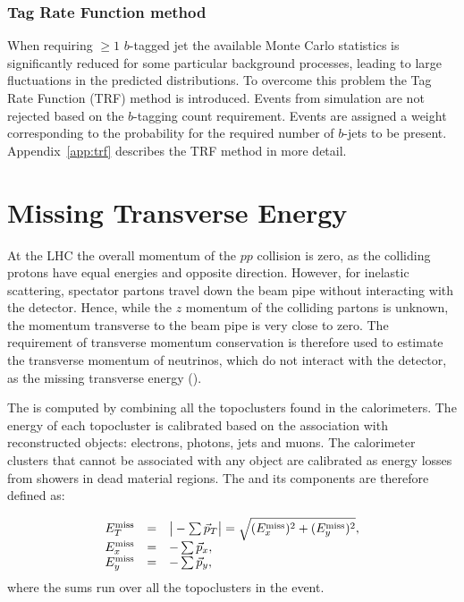 \subsubsection{Tag Rate Function method}
\label{sec:trf}

When requiring $\geq 1$ $b$-tagged jet the available Monte Carlo
statistics is significantly reduced for some particular background
processes, leading to large fluctuations in the predicted distributions.
To overcome this problem the Tag Rate Function (TRF) method is introduced.
Events from simulation are not rejected based on the $b$-tagging count
requirement. Events are assigned a weight corresponding to the
probability for the required number of $b$-jets to be present.
Appendix~\ref{app:trf} describes the TRF method in more detail.

\section{Missing Transverse Energy}
\label{sec:met}

At the LHC the overall momentum of the $pp$ collision is zero, as the
colliding protons have equal energies and opposite direction. 
However, for inelastic scattering, spectator partons travel down the
beam pipe without interacting with the detector. Hence, while the $z$
momentum of the colliding partons is unknown, the momentum transverse
to the beam pipe is very close to zero. The requirement of transverse
momentum conservation is therefore used to estimate the transverse
momentum of neutrinos, which do not interact with the detector, as the
missing transverse energy (\met{}).  

The \met{} is computed by combining all the topoclusters found in the
calorimeters. The energy of each topocluster is calibrated based on
the association with reconstructed objects: electrons, photons, jets
and muons. The calorimeter clusters that cannot be associated with any
object are calibrated as energy losses from showers in dead material
regions. The \met{} and its components are therefore defined as:

\begin{equation}\label{eq:met}
\begin{array}{lcl}
E^{\rm miss}_{T} & = & \big|-\sum\vec{p}_T \big| = \sqrt{(E^{\rm miss}_{x})^2 + (E^{\rm miss}_{y})^2} ,\\
E^{\rm miss}_{x} & = & -\sum\vec{p}_x ,\\
E^{\rm miss}_{y} & = & -\sum\vec{p}_y ,\\
\end{array}	\end{equation}
where the sums run over all the topoclusters in the event.

